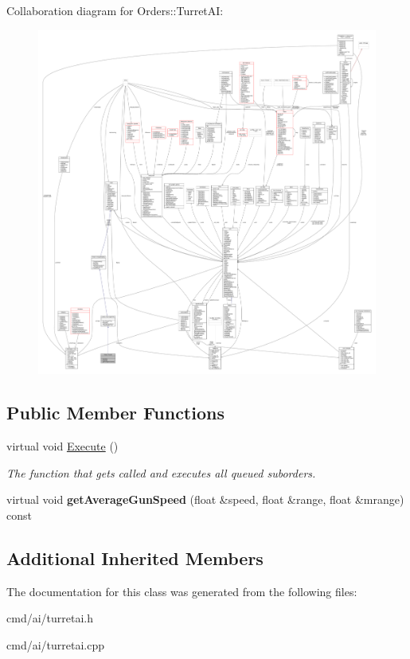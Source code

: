 Collaboration diagram for Orders\+:\+:Turret\+AI\+:
\nopagebreak
\begin{figure}[H]
\begin{center}
\leavevmode
\includegraphics[width=350pt]{d1/da4/classOrders_1_1TurretAI__coll__graph}
\end{center}
\end{figure}
\subsection*{Public Member Functions}
\begin{DoxyCompactItemize}
\item 
virtual void \hyperlink{classOrders_1_1TurretAI_aa919eb810238b31331c1b22d32c0d0a7}{Execute} ()\hypertarget{classOrders_1_1TurretAI_aa919eb810238b31331c1b22d32c0d0a7}{}\label{classOrders_1_1TurretAI_aa919eb810238b31331c1b22d32c0d0a7}

\begin{DoxyCompactList}\small\item\em The function that gets called and executes all queued suborders. \end{DoxyCompactList}\item 
virtual void {\bfseries get\+Average\+Gun\+Speed} (float \&speed, float \&range, float \&mrange) const \hypertarget{classOrders_1_1TurretAI_acd03eab29ef8f6de9580d03c13c5740b}{}\label{classOrders_1_1TurretAI_acd03eab29ef8f6de9580d03c13c5740b}

\end{DoxyCompactItemize}
\subsection*{Additional Inherited Members}


The documentation for this class was generated from the following files\+:\begin{DoxyCompactItemize}
\item 
cmd/ai/turretai.\+h\item 
cmd/ai/turretai.\+cpp\end{DoxyCompactItemize}
